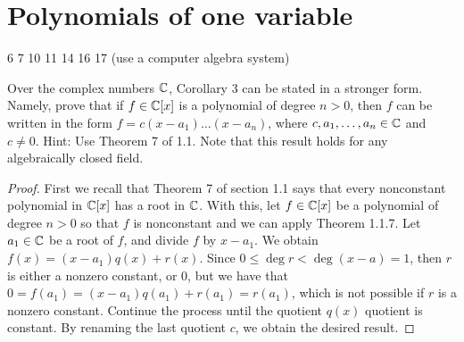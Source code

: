 \section{Polynomials of one variable}

6
7
10
11
14
16
17 (use a computer algebra system)

\begin{exercise}{1}
Over the complex numbers $\mathbb{C}$, Corollary 3 can be stated in a stronger form. Namely, prove that if $f\in\mathbb{C}[x]$ is a polynomial of degree $n>0$, then $f$ can be written in the form $f=c(x-a_1)\dots(x-a_n)$, where $c,a_1,\dots,a_n\in\mathbb{C}$ and $c\neq 0$. Hint: Use Theorem 7 of 1.1. Note that this result holds for any algebraically closed field.
\end{exercise}
\begin{proof}
First we recall that Theorem 7 of section 1.1 says that every nonconstant polynomial in $\mathbb{C}[x]$ has a root in $\mathbb{C}$. With this, let $f\in\mathbb{C}[x]$ be a polynomial of degree $n>0$ so that $f$ is nonconstant and we can apply Theorem 1.1.7. Let $a_1\in\mathbb{C}$ be a root of $f$, and divide $f$ by $x-a_1$. We obtain $f(x)=(x-a_1)q(x)+r(x)$. Since $0\leq\deg r<\deg (x-a)=1$, then $r$ is either a nonzero constant, or 0, but we have that $0 =f(a_1) =(x-a_1)q(a_1)+r(a_1) =r(a_1)$, which is not possible if $r$ is a nonzero constant. Continue the process until the quotient $q(x)$ quotient is constant. By renaming the last quotient $c$, we obtain the desired result.
\end{proof}

